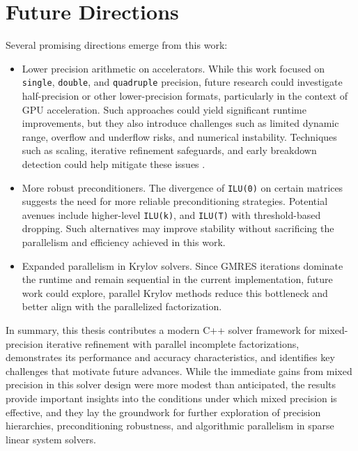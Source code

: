 \section*{Future Directions}
\label{sec:future-directions}

Several promising directions emerge from this work:

\begin{itemize}
\item Lower precision arithmetic on accelerators. While this work focused on
  \texttt{single}, \texttt{double}, and \texttt{quadruple} precision, future
  research could investigate half-precision or other lower-precision formats,
  particularly in the context of GPU acceleration. Such approaches could yield
  significant runtime improvements, but they also introduce challenges such as
  limited dynamic range, overflow and underflow risks, and numerical
  instability. Techniques such as scaling, iterative refinement safeguards, and
  early breakdown detection could help mitigate these issues
  \cite{scott_note_2024}.
\item More robust preconditioners. The divergence of \texttt{ILU(0)} on certain matrices
  suggests the need for more reliable preconditioning strategies. Potential
  avenues include higher-level \texttt{ILU(k)}, and \texttt{ILU(T)} with
  threshold-based dropping. Such alternatives may improve stability without
  sacrificing the parallelism and efficiency achieved in this work.
\item Expanded parallelism in Krylov solvers. Since GMRES iterations dominate the
  runtime and remain sequential in the current implementation, future work could
  explore, parallel Krylov methods reduce this bottleneck and better align with
  the parallelized factorization.
\end{itemize}

In summary, this thesis contributes a modern C++ solver framework for
mixed-precision iterative refinement with parallel incomplete factorizations,
demonstrates its performance and accuracy characteristics, and identifies key
challenges that motivate future advances. While the immediate gains from mixed
precision in this solver design were more modest than anticipated, the results
provide important insights into the conditions under which mixed precision is
effective, and they lay the groundwork for further exploration of precision
hierarchies, preconditioning robustness, and algorithmic parallelism in sparse
linear system solvers.
